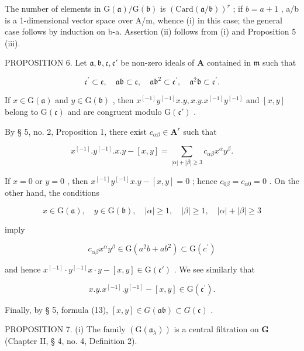 The number of elements in \(\mathrm{G}(\mathfrak{a})/\mathrm{G}(\mathfrak{b})\) is \((\mathrm{Card}(\mathfrak{a}/\mathfrak{b}))^{r}\) ; if \(b=a+1\) , a/b is a 1-dimensional vector space over A/m, whence (i) in this case; the general case follows by induction on b-a. Assertion (ii) follows from (i) and Proposition 5 (iii).

PROPOSITION 6. Let \(\mathfrak{a}, \mathfrak{b}, \mathfrak{c}, \mathfrak{c}'\) be non-zero ideals of \(\mathbf{A}\) contained in \(\mathfrak{m}\) such that

\[
\mathfrak {c} ^ {\prime} \subset \mathfrak {c}, \quad \mathfrak {a b} \subset \mathfrak {c}, \quad \mathfrak {a b} ^ {2} \subset \mathfrak {c} ^ {\prime}, \quad \mathfrak {a} ^ {2} \mathfrak {b} \subset \mathfrak {c} ^ {\prime}.
\]

If \(x \in \mathrm{G}(\mathfrak{a})\) and \(y \in \mathrm{G}(\mathfrak{b})\) , then \(x^{[-1]}y^{[-1]}x.y, x.y.x^{[-1]}y^{[-1]}\) and \([x,y]\) belong to \(\mathrm{G}(\mathfrak{c})\) and are congruent modulo \(\mathrm{G}(\mathfrak{c}')\) .

By § 5, no. 2, Proposition 1, there exist \(c_{\alpha \beta} \in \mathbf{A}^r\) such that

\[
x ^ {[ - 1 ]}. y ^ {[ - 1 ]}. x. y - [ x, y ] = \sum_ {| \alpha | + | \beta | \geqslant 3} c _ {\alpha \beta} x ^ {\alpha} y ^ {\beta}.
\]

If \(x = 0\) or \(y = 0\) , then \(x^{[-1]}y^{[-1]}x.y - [x,y] = 0\) ; hence \(c_{0\beta} = c_{\alpha 0} = 0\) . On the other hand, the conditions

\[
x \in \mathrm{G} (\mathfrak {a}), \quad y \in \mathrm{G} (\mathfrak {b}), \quad | \alpha | \geqslant 1, \quad | \beta | \geqslant 1, \quad | \alpha | + | \beta | \geqslant 3
\]

imply

\[
c _ {\alpha \beta} x ^ {\alpha} y ^ {\beta} \in \mathrm{G} (a ^ {2} b + a b ^ {2}) \subset \mathrm{G} (c ^ {\prime})
\]

and hence \(x^{[-1]} \cdot y^{[-1]}x \cdot y - [x, y] \in \mathrm{G}(\mathfrak{c}')\) . We see similarly that

\[
x. y. x ^ {[ - 1 ]}. y ^ {[ - 1 ]} - [ x, y ] \in \mathrm{G} (\mathfrak {c} ^ {\prime}).
\]

Finally, by § 5, formula (13), \([x,y] \in G(\mathfrak{ab}) \subset G(\mathfrak{c})\) .

PROPOSITION 7. (i) The family \((\mathrm{G}(\mathfrak{a}_{\lambda}))\) is a central filtration on \(\mathbf{G}\) (Chapter II, § 4, no. 4, Definition 2).

